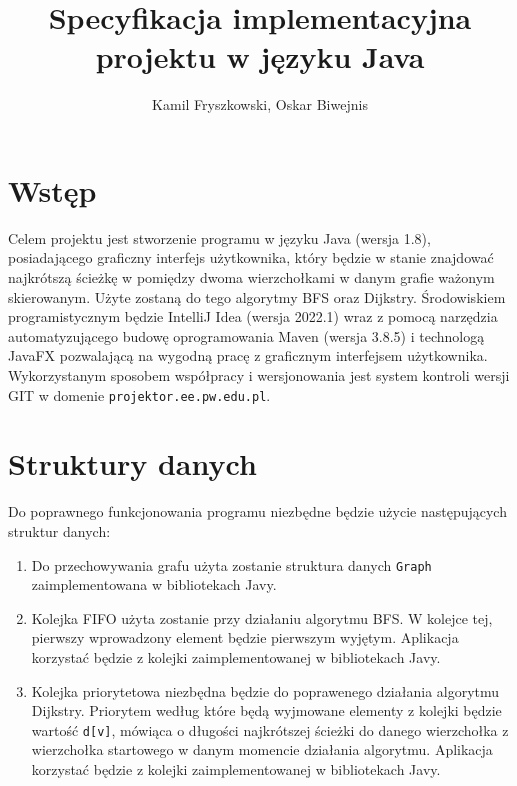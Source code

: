 \documentclass{article}
\title{Specyfikacja implementacyjna projektu w języku Java}
\author{Kamil Fryszkowski, Oskar Biwejnis}
\begin{document}
\maketitle
\thispagestyle{fancy}
\section{Wstęp}
Celem projektu jest stworzenie programu w języku Java (wersja 1.8), posiadającego graficzny interfejs użytkownika, który będzie w stanie znajdować najkrótszą ścieżkę w pomiędzy dwoma wierzchołkami w danym grafie ważonym skierowanym. Użyte zostaną do tego algorytmy BFS oraz Dijkstry. Środowiskiem programistycznym będzie IntelliJ Idea (wersja 2022.1) wraz z pomocą narzędzia automatyzującego budowę oprogramowania Maven (wersja 3.8.5) i technologą JavaFX pozwalającą na wygodną pracę z graficznym interfejsem użytkownika. Wykorzystanym sposobem współpracy i wersjonowania jest system kontroli wersji GIT w domenie \texttt{\footnotesize projektor.ee.pw.edu.pl}. 


\section{Struktury danych}
Do poprawnego funkcjonowania programu niezbędne będzie użycie następujących struktur danych:
\begin{enumerate}
\item Do przechowywania grafu użyta zostanie struktura danych \texttt{Graph} zaimplementowana w bibliotekach Javy.
\item Kolejka FIFO użyta zostanie przy działaniu algorytmu BFS. W kolejce tej, pierwszy wprowadzony element będzie pierwszym wyjętym. Aplikacja korzystać będzie z kolejki zaimplementowanej w bibliotekach Javy.

\item Kolejka priorytetowa niezbędna będzie do poprawenego działania algorytmu Dijkstry. Priorytem według które będą wyjmowane elementy z kolejki będzie wartość \texttt{d[v]}, mówiąca o długości najkrótszej ścieżki do danego wierzchołka z wierzchołka startowego w danym momencie działania algorytmu. Aplikacja korzystać będzie z kolejki zaimplementowanej w bibliotekach Javy.

\end{enumerate}
\end{document}
